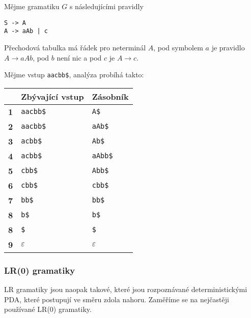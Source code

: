 \begin{example}
Mějme gramatiku $G$ s následujícími pravidly
\begin{verbatim}
S -> A
A -> aAb | c
\end{verbatim}
Přechodová tabulka má řádek pro neterminál $A$,
pod symbolem $a$ je pravidlo $A \to aAb$, pod $b$ není nic a pod $c$ je
$A \to c$.

\pagebreak

Mějme vstup \verb|aacbb$|, analýza probíhá takto:

\medskip
\centering
\begin{tabular}{|l|l|l|}
\hline
           & \textbf{Zbývající vstup} & \textbf{Zásobník}    \\ \hline
\textbf{1} & \verb|aacbb$|                  & \verb|A$|      \\ \hline
\textbf{2} & \verb|aacbb$|                  & \verb|aAb$|    \\ \hline
\textbf{3} & \verb|acbb$|                   & \verb|Ab$|     \\ \hline
\textbf{4} & \verb|acbb$|                   & \verb|aAbb$|   \\ \hline
\textbf{5} & \verb|cbb$|                    & \verb|Abb$|    \\ \hline
\textbf{6} & \verb|cbb$|                    & \verb|cbb$|    \\ \hline
\textbf{7} & \verb|bb$|                     & \verb|bb$|     \\ \hline
\textbf{8} & \verb|b$|                      & \verb|b$|      \\ \hline
\textbf{8} & \verb|$|                       & \verb|$|       \\ \hline
\textbf{9} & $\varepsilon$                              & $\varepsilon$          \\ \hline
\end{tabular}
\end{example}

\subsubsection{LR(0) gramatiky}


LR gramatiky jsou naopak takové, které jsou rozpoznávané deterministickými PDA,
které postupují ve směru zdola nahoru. Zaměříme se na nejčastěji
používané LR(0) gramatiky.

